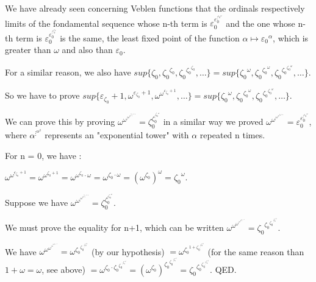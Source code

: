 \documentclass[10pt]{article}
\begin{document}
We have already seen concerning Veblen functions that the ordinals respectively limits of the fondamental sequence whose n-th term is \(\varepsilon_0^{\varepsilon_0^{\vdots^{{\varepsilon_0}^\omega}}} \) and the one whose n-th term is \( \varepsilon_0^{\varepsilon_0^{\vdots^{\varepsilon_0^{\varepsilon_0}}}} \) is the same, the least fixed point of the function \( \alpha \mapsto {\varepsilon_0}^\alpha \), which is greater than \( \omega \) and also than \( \varepsilon_0 \).

For a similar reason, we also have \( sup \lbrace \zeta_0, {\zeta_0}^{\zeta_0}, {\zeta_0}^{{\zeta_0}^{\zeta_0}}, \ldots \rbrace = sup \lbrace {\zeta_0}^\omega, {\zeta_0}^{{\zeta_0}^\omega}, {\zeta_0}^{{\zeta_0}^{{\zeta_0}^\omega}}, \ldots \rbrace \).

So we have to prove \(  sup \lbrace \varepsilon_{\zeta_0}+1, \omega^{\varepsilon_{\zeta_0}+1}, \omega^{\omega^{\varepsilon_{\zeta_0}+1}}, \ldots \rbrace = sup \lbrace {\zeta_0}^\omega, {\zeta_0}^{{\zeta_0}^\omega}, {\zeta_0}^{{\zeta_0}^{{\zeta_0}^\omega}}, \ldots \rbrace \).

We can prove this by proving \( \omega^{\omega^{\vdots^{\omega^{\omega^{\varepsilon_{\zeta_0}+1}}}}} = \zeta_0^{\zeta_0^{\vdots^{{\zeta_0}^\omega}}} \) in a similar way we proved \( \omega^{\omega^{\vdots^{\omega^{\omega^{\varepsilon_0+1}}}}} = \varepsilon_0^{\varepsilon_0^{\vdots^{{\varepsilon_0}^\omega}}} \), where \( \alpha^{\vdots^{\alpha^\beta}} \) represents an "exponential tower" with \( \alpha \) repeated n times.

For n = 0, we have : 

\( \omega^{\omega^{\varepsilon_{\zeta_0}+1}} = \omega^{\omega^{\zeta_0+1}} = \omega^{\omega^{\zeta_0} \cdot \omega} = \omega^{\zeta_0 \cdot \omega} = (\omega^{\zeta_0})^\omega = {\zeta_0}^\omega \).

Suppose we have \( \omega^{\omega^{\vdots^{\omega^{\omega^{\varepsilon_{\zeta_0}+1}}}}} = \zeta_0^{\zeta_0^{\vdots^{{\zeta_0}^\omega}}} \).

We must prove the equality for n+1, which can be written \( \omega^{\omega^{\omega^{\vdots^{\omega^{\omega^{\varepsilon_{\zeta_0}+1}}}}}} = {\zeta_0}^{{\zeta_0}^{{\zeta_0}^{\vdots^{{\zeta_0}^\omega}}}} \). 

We have \( \omega^{\omega^{\omega^{\vdots^{\omega^{\omega^{\varepsilon_{\zeta_0}+1}}}}}} = \omega^{{\zeta_0}^{{\zeta_0}^{\vdots^{{\zeta_0}^\omega}}}} \) (by our hypothesis) \( = \omega^{{\zeta_0}^{1+{\zeta_0}^{\vdots^{{\zeta_0}^\omega}}}} \) (for the same reason than \( 1+\omega = \omega \), see above) \( = \omega^{{\zeta_0} \cdot {\zeta_0}^{{\zeta_0}^{\vdots^{{\zeta_0}^\omega}}}} = (\omega^{\zeta_0})^{{\zeta_0}^{{\zeta_0}^{\vdots^{{\zeta_0}^\omega}}}} = {\zeta_0}^{{\zeta_0}^{{\zeta_0}^{\vdots^{{\zeta_0}^\omega}}}} \). QED.
\end{document}
